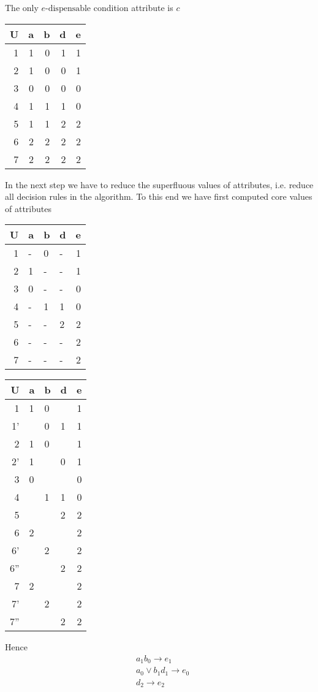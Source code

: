 \documentclass[11pt]{article}
\begin{document}
The only \(e\text{-dispensable}\) condition attribute is \(c\)
\begin{center}
\begin{tabular}{rrrrr}
U & a & b & d & e\\
\hline
1 & 1 & 0 & 1 & 1\\
2 & 1 & 0 & 0 & 1\\
3 & 0 & 0 & 0 & 0\\
4 & 1 & 1 & 1 & 0\\
5 & 1 & 1 & 2 & 2\\
6 & 2 & 2 & 2 & 2\\
7 & 2 & 2 & 2 & 2\\
\end{tabular}
\end{center}
In the next step we have to reduce the superfluous values of attributes, i.e.
reduce all decision rules in the algorithm. To this end we have first computed
core values of attributes
\begin{center}
\begin{tabular}{rlllr}
U & a & b & d & e\\
\hline
1 & - & 0 & - & 1\\
2 & 1 & - & - & 1\\
3 & 0 & - & - & 0\\
4 & - & 1 & 1 & 0\\
5 & - & - & 2 & 2\\
6 & - & - & - & 2\\
7 & - & - & - & 2\\
\end{tabular}
\end{center}

\begin{center}
\begin{tabular}{rlllr}
U & a & b & d & e\\
\hline
1 & 1 & 0 & \texttimes{} & 1\\
1' & \texttimes{} & 0 & 1 & 1\\
2 & 1 & 0 & \texttimes{} & 1\\
2' & 1 & \texttimes{} & 0 & 1\\
\hline
3 & 0 & \texttimes{} & \texttimes{} & 0\\
4 & \texttimes{} & 1 & 1 & 0\\
\hline
5 & \texttimes{} & \texttimes{} & 2 & 2\\
6 & 2 & \texttimes{} & \texttimes{} & 2\\
6' & \texttimes{} & 2 & \texttimes{} & 2\\
6'' & \texttimes{} & \texttimes{} & 2 & 2\\
7 & 2 & \texttimes{} & \texttimes{} & 2\\
7' & \texttimes{} & 2 & \texttimes{} & 2\\
7'' & \texttimes{} & \texttimes{} & 2 & 2\\
\end{tabular}
\end{center}
Hence
\begin{align*}
  &a_1b_0\to e_1\\
  &a_0\vee b_1d_1\to e_0\\
  &d_2\to e_2\\
\end{align*}
\end{document}
